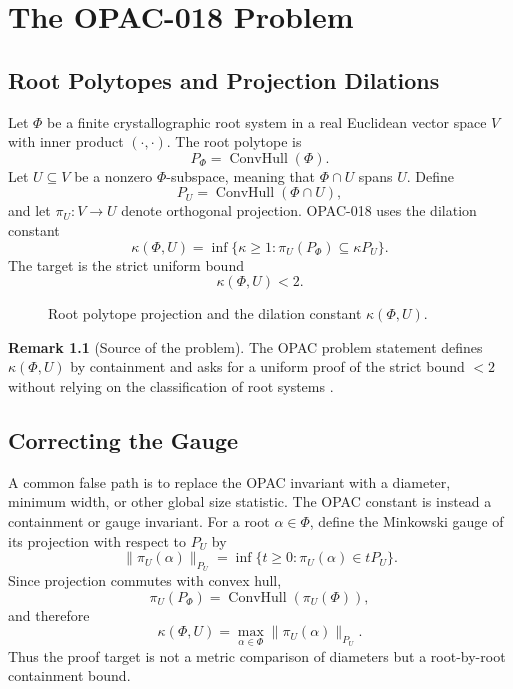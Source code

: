 \documentclass[11pt]{book}
\theoremstyle{definition}
\newtheorem{remark}[theorem]{Remark}
\newcommand{\Conv}{\operatorname{ConvHull}}
\begin{document}
\mainmatter
\part{The OPAC-018 Problem}

\chapter{Root Polytopes and Projection Dilations}
Let $\Phi$ be a finite crystallographic root system in a real Euclidean vector space $V$ with inner product $(\cdot,\cdot)$. The root polytope is
\[
 P_\Phi=\Conv(\Phi).
\]
Let $U\subseteq V$ be a nonzero $\Phi$-subspace, meaning that $\Phi\cap U$ spans $U$. Define
\[
 P_U=\Conv(\Phi\cap U),
\]
and let $\pi_U:V\to U$ denote orthogonal projection. OPAC-018 uses the dilation constant
\[
 \kappa(\Phi,U)=\inf\{\kappa\ge 1:\pi_U(P_\Phi)\subseteq \kappa P_U\}.
\]
The target is the strict uniform bound
\[
 \boxed{\kappa(\Phi,U)<2.}
\]

\begin{figure}[h]
\centering
{}
\caption{Root polytope projection and the dilation constant $\kappa(\Phi,U)$.}
\end{figure}

\begin{remark}[Source of the problem]
The OPAC problem statement defines $\kappa(\Phi,U)$ by containment and asks for a uniform proof of the strict bound $<2$ without relying on the classification of root systems \cite{opac018}.
\end{remark}

\chapter{Correcting the Gauge}
A common false path is to replace the OPAC invariant with a diameter, minimum width, or other global size statistic. The OPAC constant is instead a containment or gauge invariant. For a root $\alpha\in\Phi$, define the Minkowski gauge of its projection with respect to $P_U$ by
\[
 \|\pi_U(\alpha)\|_{P_U}=\inf\{t\ge0:\pi_U(\alpha)\in tP_U\}.
\]
Since projection commutes with convex hull,
\[
 \pi_U(P_\Phi)=\Conv(\pi_U(\Phi)),
\]
and therefore
\[
 \kappa(\Phi,U)=\max_{\alpha\in\Phi}\|\pi_U(\alpha)\|_{P_U}.
\]
Thus the proof target is not a metric comparison of diameters but a root-by-root containment bound.
\end{document}

